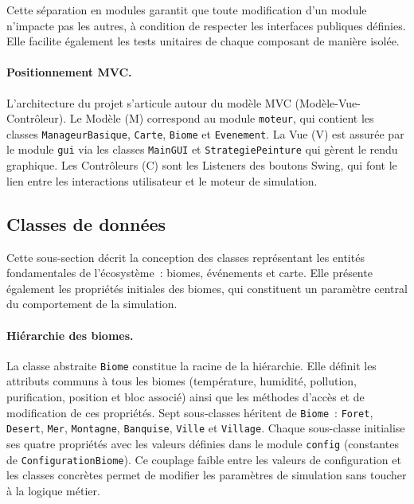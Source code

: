 Cette séparation en modules garantit que toute modification d'un module n'impacte
  pas les autres, à condition de respecter les interfaces publiques définies. Elle
  facilite également les tests unitaires de chaque composant de manière isolée.


  \paragraph{Positionnement MVC.}
  L'architecture du projet s'articule autour du modèle MVC (Modèle-Vue-Contrôleur).
  Le Modèle (M) correspond au module \texttt{moteur}, qui contient les classes
  \texttt{ManageurBasique}, \texttt{Carte}, \texttt{Biome} et \texttt{Evenement}.
  La Vue (V) est assurée par le module \texttt{gui} via les classes
  \texttt{MainGUI} et \texttt{StrategiePeinture} qui gèrent le rendu graphique.
  Les Contrôleurs (C) sont les Listeners des boutons Swing, qui font le lien entre
  les interactions utilisateur et le moteur de simulation.

\subsection{Classes de données}
\label{subsec:classes_donnees}

Cette sous-section décrit la conception des classes représentant les entités
fondamentales de l'écosystème~: biomes, événements et carte. Elle présente
également les propriétés initiales des biomes, qui constituent un paramètre
central du comportement de la simulation.

\paragraph{Hiérarchie des biomes.}
La classe abstraite \texttt{Biome} constitue la racine de la hiérarchie. Elle
définit les attributs communs à tous les biomes (température, humidité, pollution,
purification, position et bloc associé) ainsi que les méthodes d'accès et de
modification de ces propriétés. Sept sous-classes héritent de \texttt{Biome}~:
\texttt{Foret}, \texttt{Desert}, \texttt{Mer}, \texttt{Montagne}, \texttt{Banquise},
\texttt{Ville} et \texttt{Village}. Chaque sous-classe initialise ses quatre
propriétés avec les valeurs définies dans le module \texttt{config} (constantes de
\texttt{ConfigurationBiome}). Ce couplage faible entre les valeurs de configuration
et les classes concrètes permet de modifier les paramètres de simulation sans
toucher à la logique métier.

